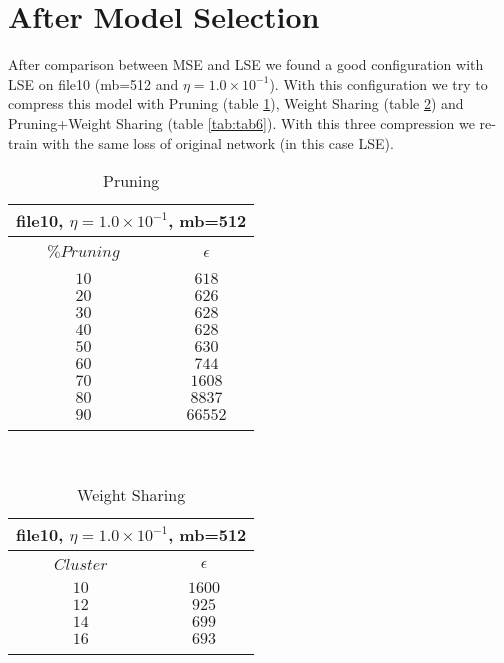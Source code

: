 \documentclass[10pt]{article}
\begin{document}
\section{After Model Selection}
	After comparison between MSE and LSE we found a good configuration with LSE on file10 (mb=512 and $\eta = 1.0\times 10^{-1}$). With this configuration we try to compress this model with Pruning (table \ref{tab:tab4}), Weight Sharing (table \ref{tab:tab5}) and Pruning+Weight Sharing (table \ref{tab:tab6}). With this three compression we re-train with the same loss of original network (in this case LSE).
\clearpage
\begin{table}[]
  \small
  \caption{Pruning}\label{tab:tab4}
\begin{center}
\begin{tabular}{cc}
\multicolumn{2}{c}{file10,  $\eta=1.0\times 10^{-1}$, mb=512} \\[5pt]
\hline\\[-11pt]
\texttt{$\% Pruning$} & \texttt{$\epsilon$} \\[5pt]
\hline\\[-11pt]

$10$ & $618$ \\ [1pt]
$20$ & $626$ \\ [1pt]
$30$ & $628$ \\ [1pt]
$40$ & $628$ \\ [1pt]
$50$ & $630$ \\ [1pt]
$60$ & $744$ \\ [1pt]
$70$ & $1608$ \\ [1pt]
$80$ & $8837$ \\ [1pt]
$90$ & $66552$ \\ [1pt]

\hline\\[-8pt]
\end{tabular}\\[5pt]
\end{center}
\normalsize
\end{table}	


\begin{table}[]
  \small
  \caption{Weight Sharing}\label{tab:tab5}
\begin{center}
\begin{tabular}{cc}
\multicolumn{2}{c}{file10,  $\eta=1.0\times 10^{-1}$, mb=512} \\[5pt]
\hline\\[-11pt]
\texttt{$Cluster$} & \texttt{$\epsilon$} \\[5pt]
\hline\\[-11pt]

$10$ & $1600$ \\ [1pt]
$12$ & $925$ \\ [1pt]
$14$ & $699$ \\ [1pt]
$16$ & $693$ \\ [1pt]

\hline\\[-8pt]
\end{tabular}\\[5pt]
\end{center}
\normalsize
\end{table}	
\end{document}
